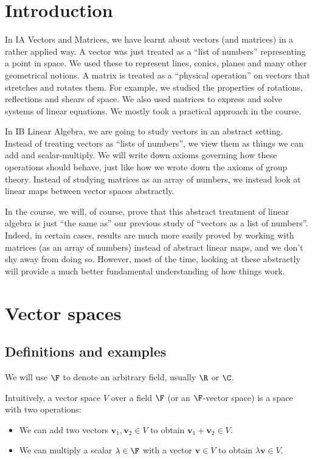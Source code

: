 \documentclass[a4paper]{article}
\begin{document}
\section{Introduction}
In IA Vectors and Matrices, we have learnt about vectors (and matrices) in a rather applied way. A vector was just treated as a ``list of numbers'' representing a point in space. We used these to represent lines, conics, planes and many other geometrical notions. A matrix is treated as a ``physical operation'' on vectors that stretches and rotates them. For example, we studied the properties of rotations, reflections and shears of space. We also used matrices to express and solve systems of linear equations. We mostly took a practical approach in the course.

In IB Linear Algebra, we are going to study vectors in an abstract setting. Instead of treating vectors as ``lists of numbers'', we view them as things we can add and scalar-multiply. We will write down axioms governing how these operations should behave, just like how we wrote down the axioms of group theory. Instead of studying matrices as an array of numbers, we instead look at linear maps between vector spaces abstractly.

In the course, we will, of course, prove that this abstract treatment of linear algebra is just ``the same as'' our previous study of ``vectors as a list of numbers''. Indeed, in certain cases, results are much more easily proved by working with matrices (as an array of numbers) instead of abstract linear maps, and we don't shy away from doing so. However, most of the time, looking at these abstractly will provide a much better fundamental understanding of how things work.

\section{Vector spaces}
\subsection{Definitions and examples}
\begin{notation}
  We will use $\F$ to denote an arbitrary field, usually $\R$ or $\C$.
\end{notation}

Intuitively, a vector space $V$ over a field $\F$ (or an $\F$-vector space) is a space with two operations:
\begin{itemize}
  \item We can add two vectors $\mathbf{v}_1, \mathbf{v}_2 \in V$ to obtain $\mathbf{v}_1 + \mathbf{v}_2 \in V$.
  \item We can multiply a scalar $\lambda \in \F$ with a vector $\mathbf{v}\in V$ to obtain $\lambda \mathbf{v} \in V$.
\end{itemize}
\end{document}
